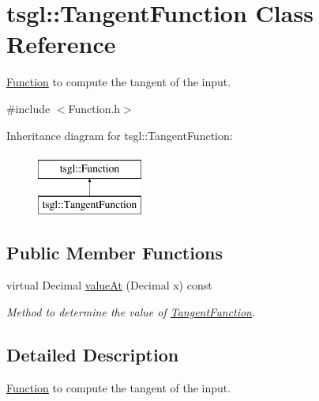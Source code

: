 \hypertarget{classtsgl_1_1_tangent_function}{\section{tsgl\-:\-:Tangent\-Function Class Reference}
\label{classtsgl_1_1_tangent_function}
}


\hyperlink{classtsgl_1_1_function}{Function} to compute the tangent of the input.  




{\ttfamily \#include $<$Function.\-h$>$}

Inheritance diagram for tsgl\-:\-:Tangent\-Function\-:\begin{figure}[H]
\begin{center}
\leavevmode
\includegraphics[height=2.000000cm]{classtsgl_1_1_tangent_function}
\end{center}
\end{figure}
\subsection*{Public Member Functions}
\begin{DoxyCompactItemize}
\item 
virtual Decimal \hyperlink{classtsgl_1_1_tangent_function_a3737542399069ebce368a5b53ba8a563}{value\-At} (Decimal x) const 
\begin{DoxyCompactList}\small\item\em Method to determine the value of \hyperlink{classtsgl_1_1_tangent_function}{Tangent\-Function}. \end{DoxyCompactList}\end{DoxyCompactItemize}


\subsection{Detailed Description}
\hyperlink{classtsgl_1_1_function}{Function} to compute the tangent of the input. 

